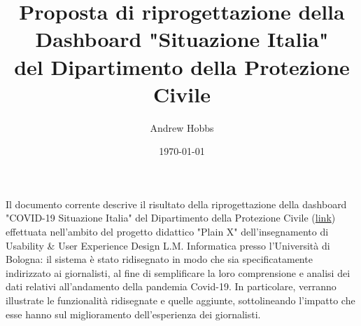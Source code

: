 \documentclass[11pt]{article}
\title{Proposta di riprogettazione della\\Dashboard "Situazione Italia"\\del Dipartimento della Protezione Civile}
\author{Andrew Hobbs}
\date{\today}
\begin{document}
\begin{titlepage}
\maketitle
\end{titlepage}

\linespread{1.15} %

\begin{executive}

Il documento corrente descrive il risultato della riprogettazione della dashboard "COVID-19 Situazione Italia" del Dipartimento della Protezione Civile (\href{https://opendatadpc.maps.arcgis.com/apps/opsdashboard/index.html#/b0c68bce2cce478eaac82fe38d4138b1}{link}) effettuata nell'ambito del progetto didattico "Plain X" dell'insegnamento di Usability \& User Experience Design L.M. Informatica presso l'Università di Bologna: il sistema è stato ridisegnato in modo che sia specificatamente indirizzato ai giornalisti, al fine di semplificare la loro comprensione e analisi dei dati relativi all'andamento della pandemia Covid-19.
In particolare, verranno illustrate le funzionalità ridisegnate e quelle aggiunte, sottolineando l'impatto che esse hanno sul miglioramento dell'esperienza dei giornalisti.

\end{executive}

{
    \hypersetup{linkcolor=black}
    \rmfamily{\tableofcontents}
}
\clearpage
\end{document}
